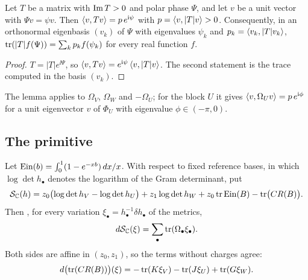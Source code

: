 \begin{lemma}\label{lem:eigenbasis}
Let $T$ be a matrix with $\operatorname{Im} T>0$ and polar phase $\Psi$, and let $v$ be a
unit vector with $\Psi v=\psi v$. Then
$\left\langle v,Tv\right\rangle=p\,e^{\mathrm i\psi}$ with $p=\left\langle v,|T|v\right\rangle>0$. Consequently, in an
orthonormal eigenbasis $(v_k)$ of $\Psi$ with eigenvalues $\psi_k$ and
$p_k=\left\langle v_k,|T|v_k\right\rangle$, $\operatorname{tr}(|T|f(\Psi))=\sum_kp_kf(\psi_k)$ for every
real function $f$.
\end{lemma}

\begin{proof}
$T=|T|e^{\ii\Psi}$, so $\left\langle v,Tv\right\rangle=e^{\mathrm i\psi}\left\langle v,|T|v\right\rangle$. The second
statement is the trace computed in the basis $(v_k)$.
\end{proof}

The lemma applies to $\Omega_V$, $\Omega_W$ and $-\Omega_U$; for the block
$U$ it gives $\left\langle v,\Omega_Uv\right\rangle=p\,e^{\mathrm i\phi}$ for a unit eigenvector $v$
of $\Phi_U$ with eigenvalue $\phi\in(-\pi,0)$.

\subsection{The primitive}
Let $\operatorname{Ein}(b)=\int_0^1(1-e^{-xb})\,dx/x$. With respect to fixed reference
bases, in which $\log\det h_\bullet$ denotes the logarithm of the Gram
determinant, put
\begin{equation}\label{eq:primitive}
 \mathcal S_{\mathbb C}(h)=z_0\bigl(\log\det h_V-\log\det h_U\bigr)+z_1\log\det h_W
 +z_0\operatorname{tr}\operatorname{Ein}(B)-\operatorname{tr}\bigl(CR(B)\bigr).
\end{equation}
Then \cite[Proposition~7.1]{wue26}, for every variation
$\xi_\bullet=h_\bullet^{-1}\delta h_\bullet$ of the metrics,
\begin{equation}\label{eq:primitivevariation}
 d\mathcal S_{\mathbb C}(\xi)=\sum_\bullet\operatorname{tr}(\Omega_\bullet\xi_\bullet).
\end{equation}
Both sides are affine in $(z_0,z_1)$, so the terms without charges agree:
\begin{equation}\label{eq:energyvariation}
 d\bigl(\operatorname{tr}(CR(B))\bigr)(\xi)=-\operatorname{tr}(K\xi_V)-\operatorname{tr}(J\xi_U)+\operatorname{tr}(G\xi_W).
\end{equation}

